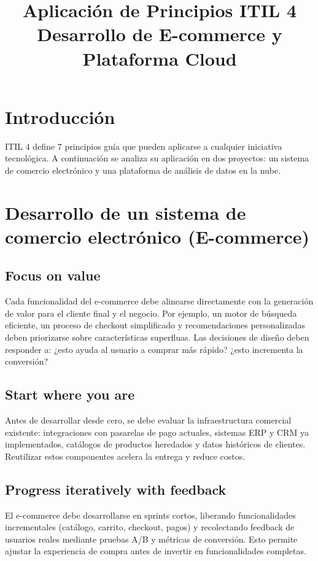 \documentclass{article}
\title{Aplicación de Principios ITIL 4\\Desarrollo de E-commerce y Plataforma Cloud}
\author{}
\date{}
\begin{document}
\maketitle

\section{Introducción}

ITIL 4 define 7 principios guía que pueden aplicarse a cualquier iniciativa tecnológica. A continuación se analiza su aplicación en dos proyectos: un sistema de comercio electrónico y una plataforma de análisis de datos en la nube.

\section{Desarrollo de un sistema de comercio electrónico (E-commerce)}

\subsection{Focus on value}
Cada funcionalidad del e-commerce debe alinearse directamente con la generación de valor para el cliente final y el negocio. Por ejemplo, un motor de búsqueda eficiente, un proceso de checkout simplificado y recomendaciones personalizadas deben priorizarse sobre características superfluas. Las decisiones de diseño deben responder a: ¿esto ayuda al usuario a comprar más rápido? ¿esto incrementa la conversión?

\subsection{Start where you are}
Antes de desarrollar desde cero, se debe evaluar la infraestructura comercial existente: integraciones con pasarelas de pago actuales, sistemas ERP y CRM ya implementados, catálogos de productos heredados y datos históricos de clientes. Reutilizar estos componentes acelera la entrega y reduce costos.

\subsection{Progress iteratively with feedback}
El e-commerce debe desarrollarse en sprints cortos, liberando funcionalidades incrementales (catálogo, carrito, checkout, pagos) y recolectando feedback de usuarios reales mediante pruebas A/B y métricas de conversión. Esto permite ajustar la experiencia de compra antes de invertir en funcionalidades completas.
\end{document}
